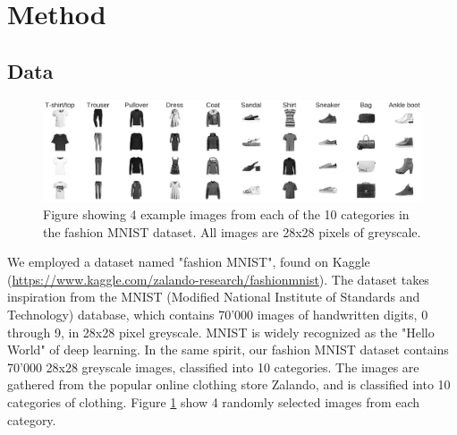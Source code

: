 \documentclass[10pt, twocolumn]{article}
\begin{document}









\section{Method}
\subsection{Data}
\label{subsubsec:Method/Data}
\begin{figure}[ht]
    \centering
    \includegraphics[scale=0.4]{../figs/fashion_examples.pdf}
    \caption{Figure showing 4 example images from each of the 10 categories in the fashion MNIST dataset. All images are 28x28 pixels of greyscale.}
    \label{fig:clothes}
\end{figure}

We employed a dataset named "fashion MNIST", found on Kaggle (\url{https://www.kaggle.com/zalando-research/fashionmnist}). The dataset takes inspiration from the MNIST (Modified National Institute of Standards and Technology) database, which contains 70'000 images of handwritten digits, 0 through 9, in 28x28 pixel greyscale. MNIST is widely recognized  as the "Hello World" of deep learning. In the same spirit, our fashion MNIST dataset contains 70'000 28x28 greyscale images, classified into 10 categories. The images are gathered from the popular online clothing store Zalando, and is classified into 10 categories of clothing. Figure \ref{fig:clothes} show 4 randomly selected images from each category.
\end{document}
